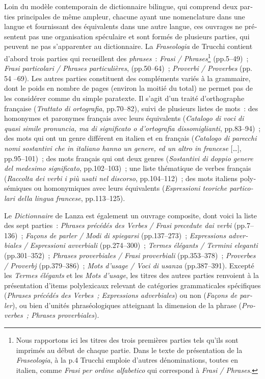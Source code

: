 \documentclass[output=paper,booklanguage=french]{langscibook}
\begin{document}
\begin{otherlanguage}{french}
Loin du modèle contemporain de dictionnaire bilingue, qui comprend deux parties principales de même ampleur, chacune ayant une nomenclature dans une langue et fournissant des équivalents dans une autre langue, ces ouvrages ne présentent pas une organisation spéculaire et sont formés de plusieurs parties, qui peuvent ne pas s’apparenter au dictionnaire. La \emph{Fraseologia} de Trucchi contient d’abord trois parties qui recueillent des \emph{phrases}~: \emph{Frasi / Phrases}\footnote{Nous rapportons ici les titres des trois premières parties tels qu’ils sont imprimés au début de chaque partie. Dans le texte de présentation de la \emph{Fraseologia}, à la p.4 Trucchi emploie d’autres dénominations, toutes en italien, comme \emph{Frasi per ordine alfabetico} qui correspond à \emph{Frasi / Phrases}.} (pp.5--49)~; \emph{Frasi particolari / Phrases particulières}, (pp.50--64)~; \emph{Proverbi / Proverbes} (pp. 54 --69). Les autres parties constituent des compléments variés à la grammaire, dont le poids en nombre de pages (environ la moitié du total) ne permet pas de les considérer comme du simple paratexte. Il s’agit d’un traité d’orthographe française (\emph{Trattato di ortografia}, pp.70--82), suivi de plusieurs listes de mots~: des homonymes et paronymes français avec leurs équivalents (\emph{Catalogo di voci di quasi simile pronuncia, ma di significato o d’ortografia dissomiglianti}, pp.83--94)~; des mots qui ont un genre différent en italien et en français (\emph{Catalogo di parecchi nomi sostantivi che in italiano hanno un genere, ed un altro in francese} […], pp.95--101)~; des mots français qui ont deux genres (\emph{Sostantivi di doppio genere del medesimo significato}, pp.102--103)~; une liste thématique de verbes français (\emph{Raccolta dei verbi i più usati nel discorso}, pp.104--112)~; des mots italiens polysémiques ou homonymiques avec leurs équivalents (\emph{Espressioni teoriche particolari della lingua francese}, pp.113--125).

Le \emph{Dictionnaire} de Lanza est également un ouvrage composite, dont voici la liste des sept parties~: \emph{Phrases précédés des Verbes / Frasi precedute dai verbi} (pp.7--136)~; \emph{Façons de parler / Modi di spiegarsi} (pp.137--273)~; \emph{Expressions adverbiales / Espressioni avverbiali} (pp.274--300)~; \emph{Termes élégants / Termini eleganti} (pp.301--352)~; \emph{Phrases proverbiales / Frasi proverbiali} (pp.353--378)~; \emph{Proverbes / Proverbj} (pp.379--386)~; \emph{Mots d’usage / Voci di usanza} (pp.387--391). Excepté les \emph{Termes élégants} et les \emph{Mots d’usage}, les titres des autres parties renvoient à la présentation d’items polylexicaux relevant de catégories grammaticales spécifiques (\emph{Phrases précédés des Verbes~; Expressions adverbiales}) ou non (\emph{Façons de parler}), ou bien d’unités phraséologiques atteignant la dimension de la phrase (\emph{Proverbes~; Phrases proverbiales}).


\end{otherlanguage}
\end{document}
